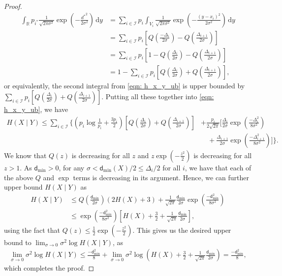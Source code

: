 \documentclass[10pt,a4paper]{amsart}
\newcommand{\bbR}{\mathbb{R}}
\newcommand{\calI}{\mathcal{I}}
\newcommand{\dmin}{\mathsf{d}_{\min}}
\newcommand{\intR}{\int_{\bbR}}
\renewcommand{\d}{\,\mathrm{d}}
\begin{document}
\begin{proof}[Proof]
\begin{align*}
			\intR p_{i^*} \tfrac{1}{\sqrt{2\pi \sigma^2}}\exp\left(-\tfrac{{d^*}^2}{2\sigma^2}\right) \d y &= \sum_{i \in \calI} p_i \int_{V_i} \tfrac{1}{\sqrt{2\pi \sigma^2}}\exp\left(-\tfrac{(y-x_i)^2}{2\sigma^2}\right) \d y\\
			&= \sum_{i \in \calI} p_i \left[Q\left(\tfrac{-\Delta_i}{2\sigma}\right)-Q\left(\tfrac{\Delta_{i+1}}{2\sigma}\right)\right]\\
			&= \sum_{i \in \calI} p_i \left[1 - Q\left(\tfrac{\Delta_i}{2\sigma}\right)-Q\left(\tfrac{\Delta_{i+1}}{2\sigma}\right)\right]\\
			&= 1 - \sum_{i \in \calI} p_i \left[Q\left(\tfrac{\Delta_i}{2\sigma}\right)+Q\left(\tfrac{\Delta_{i+1}}{2\sigma}\right)\right],
		\end{align*}
		or equivalently, the second integral from \eqref{eqn: h_x_y_ub} is upper bounded by $\sum_{i \in \calI} p_i \left[Q\left(\tfrac{\Delta_i}{2\sigma}\right)+Q\left(\tfrac{\Delta_{i+1}}{2\sigma}\right)\right]$. Putting all these together into \eqref{eqn: h_x_y_ub}, we have
		\begin{align*}
			H(X \mid Y) \leq \sum_{i \in \calI} \Big\{ \left(p_i\log \tfrac{1}{p_i}+\tfrac{3p_i}{2}\right) \left[Q\left(\tfrac{\Delta_i}{2\sigma}\right)+Q\left(\tfrac{\Delta_{i+1}}{2\sigma}\right)\right] &+ \frac{p_i}{2\sqrt{2\pi}}\Big[\tfrac{\Delta_i}{2\sigma}\exp\left(\tfrac{-\Delta_i^2}{8\sigma^2}\right)\\
			&\quad + \tfrac{\Delta_{i+1}}{2\sigma}\exp\left(\tfrac{-\Delta_{i+1}^2}{8\sigma^2}\right)\Big] \Big\}.
		\end{align*}
		We know that $Q(z)$ is decreasing for all $z$ and $z\exp(-\frac{z^2}{2})$ is decreasing for all $z > 1$. As $\dmin > 0$, for any $\sigma < \dmin(X)/2 \leq \Delta_i/2$ for all $i$, we have that each of the above $Q$ and $\exp$ terms is decreasing in its argument. Hence, we can further upper bound $H(X \mid Y)$ as
		\begin{align*}
			H(X \mid Y) &\leq Q\left(\tfrac{\dmin}{2\sigma}\right)(2H(X)+3) + \frac{1}{\sqrt{2\pi}}\tfrac{\dmin}{2\sigma}\exp\left(\tfrac{-\dmin^2}{8\sigma^2}\right)\\
			&\leq \exp\left(\tfrac{-\dmin^2}{8\sigma^2}\right) \left[H(X) + \tfrac32 + \tfrac1{\sqrt{2\pi}} \tfrac{\dmin}{2\sigma}\right],
		\end{align*}
		using the fact that $Q(z) \leq \frac{1}{2}\exp(-\frac{z^2}{2})$. This gives us the desired upper bound to $\lim_{\sigma \to 0}\sigma^2 \log H(X \mid Y)$, as
		\begin{align*}
			\lim_{\sigma \to 0} \sigma^2 \log H(X \mid Y) \leq \tfrac{-\dmin^2}{8} + \lim_{\sigma \to 0} \sigma^2 \log\left(H(X) + \tfrac32 + \tfrac1{\sqrt{2\pi}} \tfrac{\dmin}{2\sigma}\right) = \frac{-\dmin^2}{8},
		\end{align*}
		which completes the proof.
	\end{proof}
\end{document}
